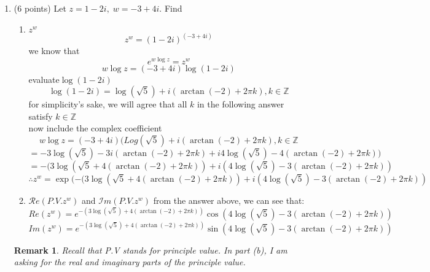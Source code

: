 \documentclass[12pt]{article}
\newtheorem*{remark}{Remark}
\begin{document}
\begin{enumerate}
\item (6 points) Let $z = 1-2i, \; w = -3 + 4i$.  Find 
\begin{enumerate}
    \item $z^{w}$
    \[
    z^w=(1-2i)^{(-3+4i)} \]we know that\[
    e^{w\log z}=z^w
    \]
    \[
    w\log z=(-3+4i)\log(1-2i)
    \]evaluate$\log(1-2i)$\[
    \log(1-2i)=\log(\sqrt{5})+i(\arctan(-2)+2\pi k),k\in\mathbb{Z}
    \]for simplicity's sake, we will agree that all $k$ in the following answer satisfy $k\in\mathbb{Z}$
    \\now include the complex coefficient\[
    w\log z=(-3+4i)(Log(\sqrt{5})+i(\arctan(-2)+2\pi k),k\in\mathbb{Z}
    \]\[
    =-3\log (\sqrt{5})-3i(\arctan (-2)+2\pi k)+i4\log(\sqrt{5})-4(\arctan (-2)+2\pi k))
    \]\[
    =-(3\log(\sqrt{5}+4(\arctan (-2)+2\pi k))+i(4\log(\sqrt{5})-3(\arctan (-2)+2\pi k))
    \]\[
    \therefore z^w = \exp{(-(3\log(\sqrt{5}+4(\arctan (-2)+2\pi k))+i(4\log(\sqrt{5})-3(\arctan (-2)+2\pi k))}
    \]
    \item $\mathcal{R}e\left(P.V. z^{w} \right)$ and $\mathcal{I}m\left(P.V. z^{w} \right)$
    from the answer above, we can see that:
    \[
    Re(z^w)=e^{-(3\log(\sqrt{5})+4(\arctan (-2)+2\pi k))}\cos(4\log(\sqrt{5})-3(\arctan (-2)+2\pi k))
    \]\[
    Im(z^w)=e^{-(3\log(\sqrt{5})+4(\arctan (-2)+2\pi k))}\sin(4\log(\sqrt{5})-3(\arctan (-2)+2\pi k))
    \]
\end{enumerate}
\begin{remark}
     Recall that P.V stands for principle value.  In part (b), I am asking for the real and imaginary parts of the principle value.  
\end{remark}





\end{enumerate} 
\end{document}
